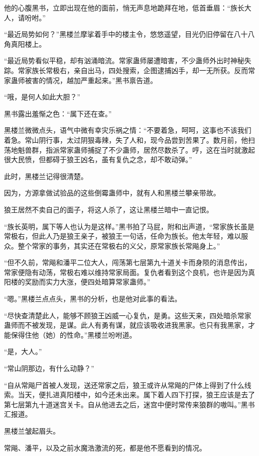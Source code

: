 \begin{this_body}
他的心腹黑书，立即出现在他的面前，悄无声息地跪拜在地，低首垂眉：“族长大人，请吩咐。”

“最近局势如何？”黑楼兰摩挲着手中的楼主令，悠悠遥望，目光仍旧停留在八十八角真阳楼上。

“最近局势看似平稳，却有汹涌暗流。常家蛊师屡遭暗害，不少蛊师外出时神秘失踪。常家族长常极右，亲自出马，四处搜索，企图逮捕凶手，却一无所获。反而常家蛊师被害的情况，越加严重起来。”黑书禀告道。

“哦，是何人如此大胆？”

黑书露出羞惭之色：“属下还在查。”

黑楼兰微微点头，语气中微有幸灾乐祸之情：“不要着急，呵呵，这事也不该我们着急。常山阴行事，太过阴狠毒辣，失了人和，现今品尝到苦果了。数月前，他扫荡地魁兽群，指派常家蛊师捕捉了不少蛊师，居然尽数杀了。哼，这在当时就激起很大民愤，但都碍于狼王凶名，虽有复仇之念，却不敢动弹。”

此时，黑楼兰记得很清楚。

因为，方源拿做试验品的这些倒霉蛊师中，就有人和黑楼兰攀亲带故。

狼王居然不卖自己的面子，将这人杀了，这让黑楼兰暗中一直记恨。

“族长英明，属下等人也认为是这样。”黑书拍了马屁，附和出声道，“常家族长虽是常极右，但此人乃是狼王亲子，被狼王一句话，任命为族长。他太年轻，难以服众。整个常家的事务，其实还在常极右的义父，原常家族长常飚身上。”

“但不久前，常飚和潘平二位大人，闯荡第七层第九十道关卡而身陨的消息传出，常家便隐有动荡，常极右难以维持常家局面。复仇者看到这个良机，也许是因为真阳楼的奖励而实力大涨，便四处暗算常家蛊师。”

“嗯。”黑楼兰点点头，黑书的分析，也是他对此事的看法。

“尽快查清楚此人，能够不顾狼王凶威一心复仇，是勇。这些天来，四处暗杀常家蛊师而不被发现，是谋。此人有勇有谋，就应该吸收进我黑家。也只有我黑家，才能保得住他（她）的性命。”黑楼兰吩咐道。

“是，大人。”

“常山阴那边，有什么动静？”

“自从常飚尸首被人发现，送还常家之后，狼王或许从常飚的尸体上得到了什么线索。当天，便扎进真阳楼中，如今还未出来。属下着人四下打探，狼王应该是去了第七层第九十道迷宫关卡。自从他进去之后，迷宫中便时常传来狼群的嗷叫。”黑书汇报道。

黑楼兰皱起眉头。

常飚、潘平，以及之前水魔浩激流的死，都是他不愿看到的情况。


\end{this_body}
